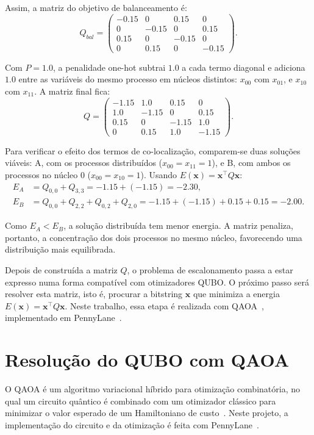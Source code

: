 \documentclass[12pt,a4paper]{article}
\begin{document}
Assim, a matriz do objetivo de balanceamento é:
\begin{equation}
Q_{bal} =
\begin{pmatrix}
-0.15 & 0 & 0.15 & 0 \\
0 & -0.15 & 0 & 0.15 \\
0.15 & 0 & -0.15 & 0 \\
0 & 0.15 & 0 & -0.15
\end{pmatrix}.
\end{equation}

Com $P=1.0$, a penalidade one-hot subtrai $1.0$ a cada termo diagonal e adiciona $1.0$
entre as variáveis do mesmo processo em núcleos distintos: $x_{00}$ com $x_{01}$, e
$x_{10}$ com $x_{11}$. A matriz final fica:
\begin{equation}
Q =
\begin{pmatrix}
-1.15 & 1.0 & 0.15 & 0 \\
1.0 & -1.15 & 0 & 0.15 \\
0.15 & 0 & -1.15 & 1.0 \\
0 & 0.15 & 1.0 & -1.15
\end{pmatrix}.
\end{equation}

Para verificar o efeito dos termos de co-localização, comparem-se duas soluções viáveis:
A, com os processos distribuídos ($x_{00}=x_{11}=1$), e B, com ambos os processos no
núcleo $0$ ($x_{00}=x_{10}=1$). Usando $E(\mathbf{x})=\mathbf{x}^{\top}Q\mathbf{x}$:
\begin{align}
E_A &= Q_{0,0} + Q_{3,3}
= -1.15 + (-1.15)
= \mathbf{-2.30},\\
E_B &= Q_{0,0} + Q_{2,2} + Q_{0,2} + Q_{2,0}
= -1.15 + (-1.15) + 0.15 + 0.15
= \mathbf{-2.00}.
\end{align}

Como $E_A < E_B$, a solução distribuída tem menor energia. A matriz penaliza, portanto,
a concentração dos dois processos no mesmo núcleo, favorecendo uma distribuição mais
equilibrada.

Depois de construída a matriz $Q$, o problema de escalonamento passa a estar expresso
numa forma compatível com otimizadores QUBO. O próximo passo será resolver esta matriz, isto é, procurar a bitstring $\mathbf{x}$ que minimiza a energia $E(\mathbf{x})=\mathbf{x}^{\top}Q\mathbf{x}$. Neste trabalho, essa etapa é realizada
com QAOA~\cite{Farhi2014QAOA}, implementado em PennyLane~\cite{Bergholm2018PennyLane}.

\section{Resolução do QUBO com QAOA}
O QAOA é um algoritmo variacional híbrido para otimização combinatória, no qual
um circuito quântico é combinado com um otimizador clássico para
minimizar o valor esperado de um Hamiltoniano de custo~\cite{Farhi2014QAOA,Cerezo2021VQA}.
Neste projeto, a implementação do circuito e da otimização é feita com PennyLane~\cite{Bergholm2018PennyLane}.
\end{document}
